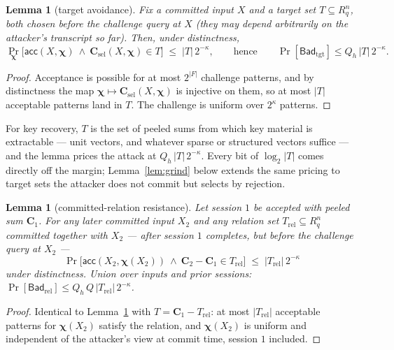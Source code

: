 \documentclass[11pt]{article}
\newcommand{\R}{R_q}
\newcommand{\Bad}{\mathsf{Bad}}
\newtheorem{lemma}[theorem]{Lemma}
\begin{document}
\begin{lemma}[target avoidance]
\label{lem:target}
Fix a committed input $X$ and a target set $T\subseteq\R^{n}$, both chosen
before the challenge query at $X$ (they may depend arbitrarily on the
attacker's transcript so far).  Then, under distinctness,
\[
 \Pr_{\boldsymbol\chi}\bigl[\mathsf{acc}(X,\boldsymbol\chi)\ \wedge\
 \mathbf C_{\mathrm{sel}}(X,\boldsymbol\chi)\in T\bigr]
 \;\le\;|T|\,2^{-\kappa},
 \qquad\text{hence}\qquad
 \Pr[\Bad_{\mathrm{tgt}}]\le Q_h\,|T|\,2^{-\kappa}.
\]
\end{lemma}

\begin{proof}
Acceptance is possible for at most $2^{|F|}$ challenge patterns, and by
distinctness the map
$\boldsymbol\chi\mapsto\mathbf C_{\mathrm{sel}}(X,\boldsymbol\chi)$ is
injective on them, so at most $|T|$ acceptable patterns land in $T$.  The
challenge is uniform over $2^{\kappa}$ patterns.
\end{proof}

For key recovery, $T$ is the set of peeled sums from which key material is
extractable --- unit vectors, and whatever sparse or structured vectors
suffice --- and the lemma prices the attack at
$Q_h\,|T|\,2^{-\kappa}$.  Every bit of $\log_2|T|$ comes directly off the
margin; Lemma~\ref{lem:grind} below extends the same pricing to target sets
the attacker does not commit but selects by rejection.

\begin{lemma}[committed-relation resistance]
\label{lem:relation}
Let session $1$ be accepted with peeled sum $\mathbf C_1$.  For any later
committed input $X_2$ and any relation set $T_{\mathrm{rel}}\subseteq\R^{n}$
committed together with $X_2$ --- after session $1$ completes, but before the
challenge query at $X_2$ ---
\[
 \Pr\bigl[\mathsf{acc}(X_2,\boldsymbol\chi(X_2))\ \wedge\
 \mathbf C_2-\mathbf C_1\in T_{\mathrm{rel}}\bigr]
 \;\le\;|T_{\mathrm{rel}}|\,2^{-\kappa}
\]
under distinctness.  Union over inputs and prior sessions:
$\Pr[\Bad_{\mathrm{rel}}]\le Q_h\,Q\,|T_{\mathrm{rel}}|\,2^{-\kappa}$.
\end{lemma}

\begin{proof}
Identical to Lemma~\ref{lem:target} with
$T=\mathbf C_1-T_{\mathrm{rel}}$: at most $|T_{\mathrm{rel}}|$ acceptable
patterns for $\boldsymbol\chi(X_2)$ satisfy the relation, and
$\boldsymbol\chi(X_2)$ is uniform and independent of the attacker's view at
commit time, session $1$ included.
\end{proof}
\end{document}
